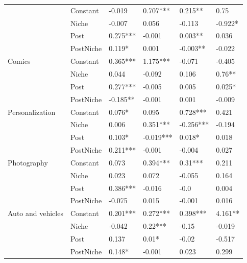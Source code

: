 \begin{longtable}[h!]{llllll}
\bottomrule
\endlastfoot
\multirow{4}{*}{Art and design} & Constant &              -0.019 &    0.707*** &    0.215** &       0.75 \\
          & Niche &              -0.007 &       0.056 &     -0.113 &    -0.922* \\
          & Post &            0.275*** &      -0.001 &    0.003** &      0.036 \\
          & PostNiche &              0.119* &       0.001 &   -0.003** &     -0.022 \\
\cline{1-6}
\multirow{4}{*}{Comics} & Constant &            0.365*** &    1.175*** &     -0.071 &     -0.405 \\
          & Niche &               0.044 &      -0.092 &      0.106 &     0.76** \\
          & Post &            0.277*** &      -0.005 &      0.005 &     0.025* \\
          & PostNiche &            -0.185** &      -0.001 &      0.001 &     -0.009 \\
\cline{1-6}
\multirow{4}{*}{Personalization} & Constant &              0.076* &       0.095 &   0.728*** &      0.421 \\
          & Niche &               0.006 &    0.351*** &  -0.256*** &     -0.194 \\
          & Post &              0.103* &   -0.019*** &     0.018* &      0.018 \\
          & PostNiche &            0.211*** &      -0.001 &     -0.004 &      0.027 \\
\cline{1-6}
\multirow{4}{*}{Photography} & Constant &               0.073 &    0.394*** &    0.31*** &      0.211 \\
          & Niche &               0.023 &       0.072 &     -0.055 &      0.164 \\
          & Post &            0.386*** &      -0.016 &       -0.0 &      0.004 \\
          & PostNiche &              -0.075 &       0.015 &     -0.001 &      0.016 \\
\cline{1-6}
\multirow{4}{*}{Auto and vehicles} & Constant &            0.201*** &    0.272*** &   0.398*** &    4.161** \\
          & Niche &              -0.042 &     0.22*** &      -0.15 &     -0.019 \\
          & Post &               0.137 &       0.01* &      -0.02 &     -0.517 \\
          & PostNiche &              0.148* &      -0.001 &      0.023 &      0.299 \\

\end{longtable}
